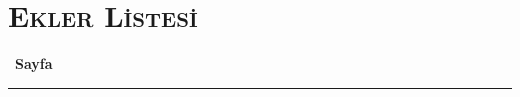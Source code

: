 \chapter*{\Large \scshape Ekler L\.{i}stes\.{i}}
\vspace{-0.35cm}
~\hfill\footnotesize\textbf{Sayfa}\vspace{-0.4cm}
\rule{\textwidth}{0.3pt}\vspace{-0.35cm}

\begin{table}[ht!]
\begin{footnotesize}
\begin{tabular}{p{} p{}}
%


\end{tabular}
\end{footnotesize}
\end{table}

\newpage
